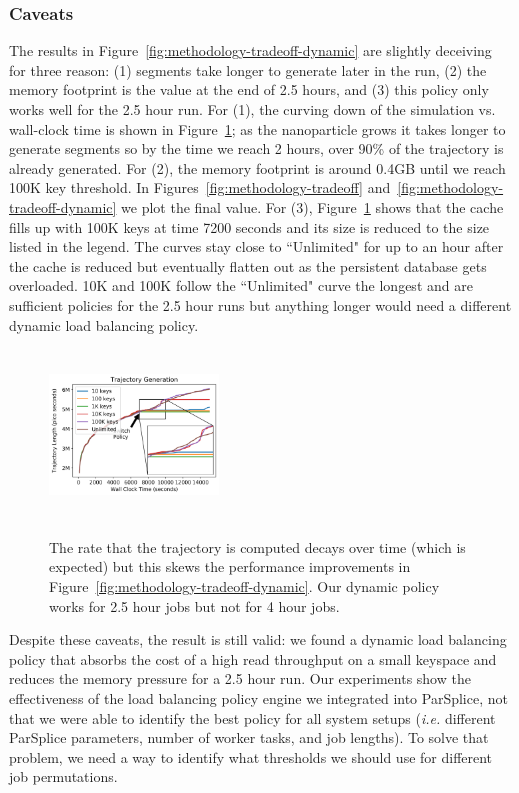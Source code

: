 \subsubsection*{Caveats}

The results in Figure~\ref{fig:methodology-tradeoff-dynamic} are slightly
deceiving for three reason: (1) segments take longer to generate later in the
run, (2) the memory footprint is the value at the end of 2.5 hours, and (3)
this policy only works well for the 2.5 hour run.  For (1), the curving down of
the simulation vs. wall-clock time is shown in
Figure~\ref{fig:methodology-trajectory}; as the nanoparticle grows it takes
longer to generate segments so by the time we reach 2 hours, over 90\% of the
trajectory is already generated.  For (2), the memory footprint is around 0.4GB
until we reach 100K key threshold. In
Figures~\ref{fig:methodology-tradeoff}
and~\ref{fig:methodology-tradeoff-dynamic} we plot the final value. For (3),
Figure~\ref{fig:methodology-trajectory} shows that the cache fills up with 100K
keys at time 7200 seconds and its size is reduced to the size listed in the
legend.  The curves stay close to ``Unlimited" for up to an hour after the
cache is reduced but eventually flatten out as the persistent database gets
overloaded. 10K and 100K follow the ``Unlimited" curve the longest and are
sufficient policies for the 2.5 hour runs but anything longer would need a
different dynamic load balancing policy.

\begin{figure}[t]
  \noindent\includegraphics[height=4.5cm,width=0.4\textwidth]{figures/methodology-trajectory.png}\\
  \caption{The rate that the trajectory is computed decays over time (which is
  expected) but this skews the performance improvements in
  Figure~\ref{fig:methodology-tradeoff-dynamic}. Our dynamic policy works for 2.5
  hour jobs but not for 4 hour jobs.  \label{fig:methodology-trajectory}}
\end{figure}

Despite these caveats, the result is still valid: we found a dynamic load
balancing policy that absorbs the cost of a high read throughput on a small
keyspace and reduces the memory pressure for a 2.5 hour run. Our experiments
show the effectiveness of the load balancing policy engine we integrated into
ParSplice, not that we were able to identify the best policy for all system
setups ({\it i.e.} different ParSplice parameters, number of worker tasks, and
job lengths).  To solve that problem, we need a way to identify what thresholds
we should use for different job permutations.


